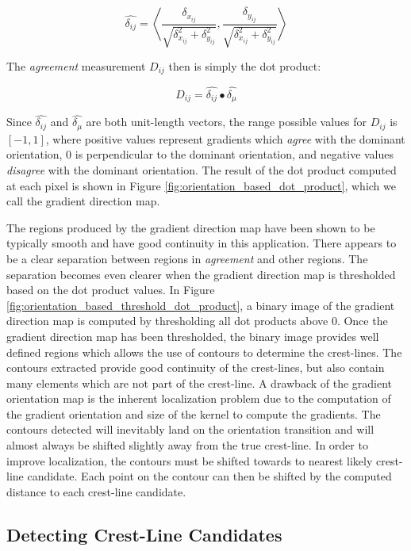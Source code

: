 \begin{equation}
\hat{\delta_{ij}} = \left\langle \frac{\delta_{x_{ij}}}{\sqrt{\delta_{x_{ij}}^2 + \delta_{y_{ij}}^2}}, \frac{\delta_{y_{ij}}}{\sqrt{\delta_{x_{ij}}^2 + \delta_{y_{ij}}^2}}\right\rangle 
\end{equation}

The \emph{agreement} measurement $D_{ij}$ then is simply the dot product:

\begin{equation}
D_{ij} = \hat{\delta_{ij}} \bullet \hat{\delta_{\mu}}
\end{equation}

Since $\hat{\delta_{ij}}$ and $\hat{\delta_{\mu}}$ are both unit-length vectors, the range possible values for $D_{ij}$ is $[-1, 1]$, where positive values represent gradients which \emph{agree} with the dominant orientation, 0 is perpendicular to the dominant orientation, and negative values \emph{disagree} with the dominant orientation. The result of the dot product computed at each pixel is shown in Figure \ref{fig:orientation_based_dot_product}, which we call the gradient direction map.

The regions produced by the gradient direction map have been shown to be typically smooth and have good continuity in this application. There appears to be a clear separation between regions in \emph{agreement} and other regions. The separation becomes even clearer when the gradient direction map is thresholded based on the dot product values. In Figure \ref{fig:orientation_based_threshold_dot_product}, a binary image of the gradient direction map is computed by thresholding all dot products above 0. Once the gradient direction map has been thresholded, the binary image provides well defined regions which allows the use of contours to determine the crest-lines. The contours extracted provide good continuity of the crest-lines, but also contain many elements which are not part of the crest-line. A drawback of the gradient orientation map is the inherent localization problem due to the computation of the gradient orientation and size of the kernel to compute the gradients. The contours detected will inevitably land on the orientation transition and will almost always be shifted slightly away from the true crest-line. In order to improve localization, the contours must be shifted towards to nearest likely crest-line candidate. Each point on the contour can then be shifted by the computed distance to each crest-line candidate.


\subsection{Detecting Crest-Line Candidates}

